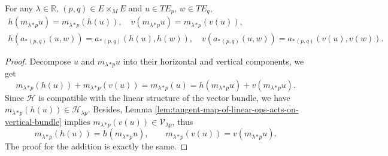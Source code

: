 \begin{lemma}\label{lem:H-compatible-with-linear-str}
    For any $\lambda\in\mathbb{R},\,(p,q)\in E\times_M E$ and $u\in TE_p,\,w\in TE_q$, 
    \begin{gather*}
        h(m_{\lambda}{}_*{}_p u) = m_{\lambda}{}_*{}_p(h(u)), \quad v(m_{\lambda}{}_*{}_p u) = m_{\lambda}{}_*{}_p(v(u)), \\
        h(a_*{}_{(p,q)}(u,w)) = a_*{}_{(p,q)}(h(u),h(w)), \quad v(a_*{}_{(p,q)}(u,w)) = a_*{}_{(p,q)}(v(u),v(w)).
    \end{gather*}
\end{lemma}
\begin{proof}
    Decompose $u$ and $m_{\lambda}{}_*{}_p u$ into their horizontal and vertical components, we get 
    \begin{equation*}
        m_{\lambda}{}_*{}_p(h(u)) + m_{\lambda}{}_*{}_p(v(u)) = m_{\lambda}{}_*{}_p(u) 
        = h(m_{\lambda}{}_*{}_p u) + v(m_{\lambda}{}_*{}_p u).
    \end{equation*}
    Since $\mathcal{H}$ is compatible with the linear structure of the vector bundle, 
    we have $m_{\lambda}{}_*{}_p(h(u))\in \mathcal{H}_{\lambda p}$. Besides, 
    Lemma \ref{lem:tangent-map-of-linear-ops-acts-on-vertical-bundle} implies 
    $m_{\lambda}{}_*{}_p(v(u))\in \mathcal{V}_{\lambda p}$, thus 
    \begin{equation*}
        m_{\lambda}{}_*{}_p(h(u)) = h(m_{\lambda}{}_*{}_p u), \qquad m_{\lambda}{}_*{}_p(v(u)) = v(m_{\lambda}{}_*{}_p u).
    \end{equation*}
    The proof for the addition is exactly the same.
\end{proof}

